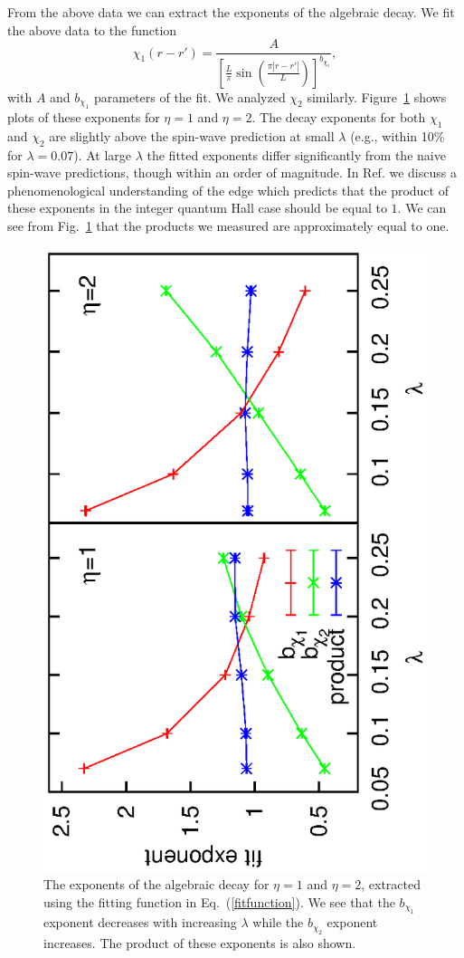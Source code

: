 From the above data we can extract the exponents of the algebraic decay. We fit the above data to the function
\begin{equation}
\chi_1(r-r')=\frac{A}{\left[\frac{L}{\pi}\sin\left(\frac{\pi|r-r'|}{L}\right)\right]^{b_{\chi_1}}},
\label{fitfunction}
\end{equation}
with $A$ and $b_{\chi_1}$ parameters of the fit. We analyzed $\chi_2$ similarly.  Figure~\ref{exponents} shows plots of these exponents for $\eta=1$ and $\eta=2$. The decay exponents for both $\chi_1$ and $\chi_2$ are slightly above the spin-wave prediction at small $\lambda$ (e.g., within 10\% for $\lambda =0.07$). At large $\lambda$ the fitted exponents differ significantly from the naive spin-wave predictions, though within an order of magnitude. 
In Ref.\cite{FQHE}
 we discuss a phenomenological understanding of the edge which predicts that the product of these exponents in the integer quantum Hall case should be equal to $1$.
We can see from Fig.~\ref{exponents} that the products we measured are approximately equal to one.

\begin{figure}
\includegraphics[width=0.4\linewidth,angle=-90]{figures/exp1.eps}
\caption{ The exponents of the algebraic decay for $\eta=1$ and $\eta=2$, extracted using the fitting function in Eq.~(\ref{fitfunction}). We see that the $b_{\chi_1}$ exponent decreases with increasing $\lambda$ while the $b_{\chi_2}$ exponent increases. The product of these exponents is also shown.
\label{exponents}}
\end{figure}

